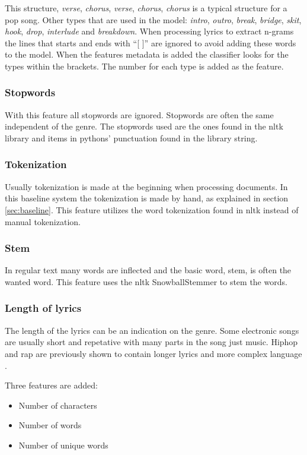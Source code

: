 \documentclass[a4paper, 12pt]{article}
\begin{document}
This structure, \textit{verse}, \textit{chorus}, \textit{verse}, \textit{chorus}, \textit{chorus} is a typical structure for a pop song.
Other types that are used in the model: \textit{intro}, \textit{outro}, \textit{break}, \textit{bridge}, \textit{skit}, \textit{hook}, \textit{drop}, \textit{interlude} and \textit{breakdown}.
When processing lyrics to extract n-grams the lines that starts and ends with ``[ ]'' are ignored to avoid adding these words to the model.
When the features metadata is added the classifier looks for the types within the brackets.
The number for each type is added as the feature.

\subsubsection*{Stopwords}
With this feature all stopwords are ignored.
Stopwords are often the same independent of the genre.
The stopwords used are the ones found in the nltk library and items in pythons' punctuation found in the library string.

\subsubsection*{Tokenization}
Usually tokenization is made at the beginning when processing documents.
In this baseline system the tokenization is made by hand, as explained in section \ref{sec:baseline}.
This feature utilizes the word tokenization found in nltk instead of manual tokenization.

\subsubsection*{Stem}
In regular text many words are inflected and the basic word, stem, is often the wanted word.
This feature uses the nltk SnowballStemmer to stem the words.

\subsubsection*{Length of lyrics}
The length of the lyrics can be an indication on the genre.
Some electronic songs are usually short and repetative with many parts in the song just music.
Hip\/hop and rap are previously shown to contain longer lyrics and more complex language .

Three features are added:
\begin{itemize}
    \item {Number of characters}
    \item {Number of words}
    \item {Number of unique words}
\end{itemize}
\end{document}
